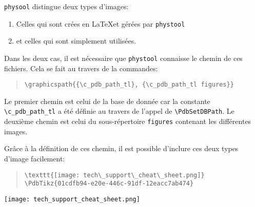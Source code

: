 \begin{theory}[title=Inclusion d'image]
	\verb|physool| distingue deux types d'images:
	\begin{enumerate}
		\item Celles qui sont crées en \LaTeX et gérées par \verb|phystool|
		\item et celles qui sont simplement utilisées.
	\end{enumerate}

	Dans les deux cas, il est nécessaire que \verb|phystool| connaisse le
	chemin de ces fichiers. Cela se fait au travers de la commandes:
	\begin{quote}
		\verb|\graphicspath{{\c_pdb_path_tl}, {\c_pdb_path_tl figures}}|
	\end{quote}
	Le premier chemin est celui de la base de donnée car la constante
	\verb|\c_pdb_path_tl| a été définie au travers de l'appel de
	\verb|\PdbSetDBPath|. Le deuxième chemin est celui du sous-répertoire
	\verb|figures| contenant les différentes images.

	Grâce à la définition de ces chemin, il est possible d'inclure ces deux
	types d'image facilement:
	\begin{quote}
		\verb|\texttt{[image: tech\_support\_cheat\_sheet.png]}|
		\verb|\PdbTikz{01cdfb94-e20e-446c-91df-12eacc7ab474}|
	\end{quote}

	\begin{center}
		\texttt{[image: tech\_support\_cheat\_sheet.png]}
	\end{center}
\end{theory}
